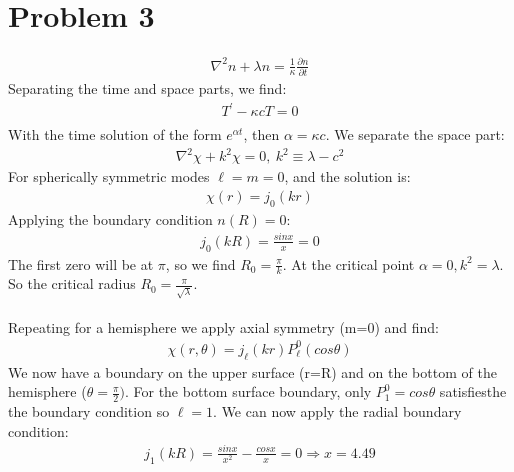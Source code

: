 \documentclass[a4paper,10pt]{article}
\numberwithin{equation}{section}
\begin{document}
\section{Problem 3}
\begin{gather}
 \nabla^2n+\lambda n=\frac{1}{\kappa}\frac{\partial n}{\partial t}
\end{gather}
Separating the time and space parts, we find:
\begin{gather}
 T^{'}-\kappa cT=0\\
\end{gather}
With the time solution of the form $e^{\alpha t}$, then $\alpha=\kappa c$.
We separate the space part:
\begin{gather}
 \nabla ^2 \chi + k^2 \chi = 0,\ k^2 \equiv \lambda-c^2
\end{gather}
For spherically symmetric modes $\ell=m=0$, and the solution is:
\begin{gather}
 \chi(r)=j_0(kr)
\end{gather}
Applying the boundary condition $n(R)=0$:
\begin{gather}
 j_0(kR)=\frac{sinx}{x}=0
\end{gather}
The first zero will be at $\pi$, so we find $R_0=\frac{\pi}{k}$.
At the critical point $\alpha=0,k^2=\lambda$. 
So the critical radius $R_0=\frac{\pi}{\sqrt{\lambda}}$. \\ \\
Repeating for a hemisphere we apply axial symmetry (m=0) and find:
\begin{gather}
 \chi(r,\theta )=j_{\ell}(kr)P_{\ell}^{0}(cos \theta )
\end{gather}
We now have a boundary on the upper surface (r=R) and on the bottom of the hemisphere ($\theta=\frac{\pi}{2})$.
For the bottom surface boundary, only $P_{1}^{0}=cos\theta$ satisfiesthe the boundary condition so $\ell=1$.
We can now apply the radial boundary condition:
\begin{gather}
 j_1(kR)=\frac{sinx}{x^2}-\frac{cosx}{x}=0 \Rightarrow x=4.49
\end{gather}
\end{document}
